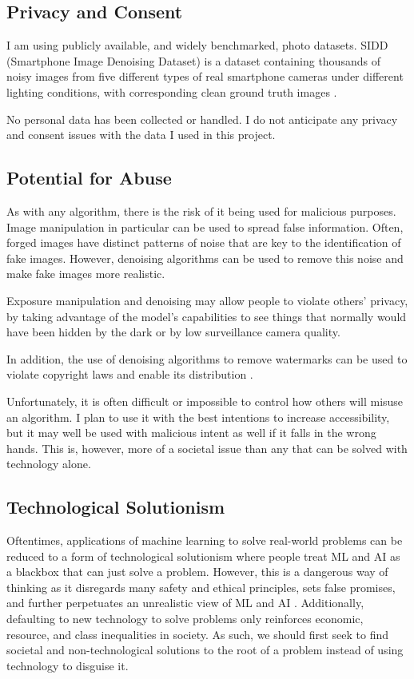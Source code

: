 \documentclass[10pt,twocolumn]{article}
\begin{document}
\subsection{Privacy and Consent}
I am using publicly available, and widely benchmarked, photo datasets. SIDD (Smartphone Image Denoising Dataset) is a dataset containing thousands of noisy images from five different types of real smartphone cameras under different lighting conditions, with corresponding clean ground truth images \cite{sidd}.

No personal data has been collected or handled. I do not anticipate any privacy and consent issues with the data I used in this project.

\subsection{Potential for Abuse}
As with any algorithm, there is the risk of it being used for malicious purposes. Image manipulation in particular can be used to spread false information. Often, forged images have distinct patterns of noise that are key to the identification of fake images. However, denoising algorithms can be used to remove this noise and make fake images more realistic.

Exposure manipulation and denoising may allow people to violate others’ privacy, by taking advantage of the model’s capabilities to see things that normally would have been hidden by the dark or by low surveillance camera quality.

In addition, the use of denoising algorithms to remove watermarks can be used to violate copyright laws and enable its distribution \cite{watermark}.

Unfortunately, it is often difficult or impossible to control how others will misuse an algorithm. I plan to use it with the best intentions to increase accessibility, but it may well be used with malicious intent as well if it falls in the wrong hands. This is, however, more of a societal issue than any that can be solved with technology alone. 

\subsection{Technological Solutionism}

Oftentimes, applications of machine learning to solve real-world problems can be reduced to a form of technological solutionism where people treat ML and AI as a blackbox that can just solve a problem. However, this is a dangerous way of thinking as it disregards many safety and ethical principles, sets false promises, and further perpetuates an unrealistic view of ML and AI \cite{ts}. Additionally, defaulting to new technology to solve problems only reinforces economic, resource, and class inequalities in society. As such, we should first seek to find societal and non-technological solutions to the root of a problem instead of using technology to disguise it.
\end{document}

